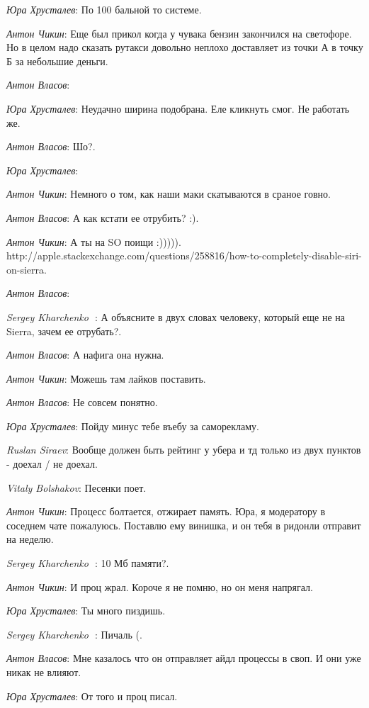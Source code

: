 \documentclass[10pt]{book}
\newcommand{\AUTHOR}[1]{\emph{#1}:}
\begin{document}
\AUTHOR{Юра Хрусталев} По 100 бальной то системе.

\AUTHOR{Антон Чикин} Еще был прикол когда у чувака бензин закончился на светофоре. Но в целом надо сказать рутакси довольно неплохо доставляет из точки А в точку Б за небольшие деньги.

\AUTHOR{Антон Власов}

\AUTHOR{Юра Хрусталев} Неудачно ширина подобрана. Еле кликнуть смог. Не работать же.

\AUTHOR{Антон Власов} Шо?.

\AUTHOR{Юра Хрусталев}

\AUTHOR{Антон Чикин}  Немного о том, как наши маки скатываются в сраное говно.

\AUTHOR{Антон Власов} А как кстати ее отрубить? :).

\AUTHOR{Антон Чикин} А ты на SO поищи :))))). http://apple.stackexchange.com/questions/258816/how-to-completely-disable-siri-on-sierra.

\AUTHOR{Антон Власов}

\AUTHOR{Sergey Kharchenko 🦁} А объясните в двух словах человеку, который еще не на Sierra, зачем ее отрубать?.

\AUTHOR{Антон Власов} А нафига она нужна.

\AUTHOR{Антон Чикин} Можешь там лайков поставить.

\AUTHOR{Антон Власов} Не совсем понятно.

\AUTHOR{Юра Хрусталев} Пойду минус тебе въебу за саморекламу.

\AUTHOR{Ruslan Siraev} Вообще должен быть рейтинг у убера и тд только из двух пунктов - доехал / не доехал.

\AUTHOR{Vitaly Bolshakov} Песенки поет.

\AUTHOR{Антон Чикин} Процесс болтается, отжирает память. Юра, я модератору в соседнем чате пожалуюсь. Поставлю ему винишка, и он тебя в ридонли отправит на неделю.

\AUTHOR{Sergey Kharchenko 🦁} 10 Мб памяти?.

\AUTHOR{Антон Чикин} И проц жрал. Короче я не помню, но он меня напрягал.

\AUTHOR{Юра Хрусталев} Ты много пиздишь.

\AUTHOR{Sergey Kharchenko 🦁} Пичаль (.

\AUTHOR{Антон Власов} Мне казалось что он отправляет айдл процессы в своп. И они уже никак не влияют.

\AUTHOR{Юра Хрусталев} От того и проц писал.
\end{document}
